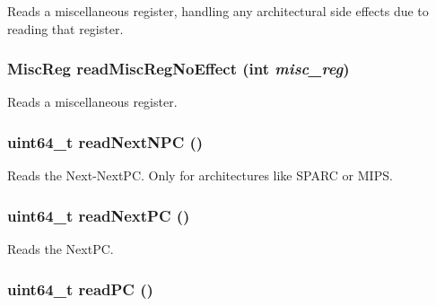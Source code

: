 \label{classExecContext_a5a8c6c487e8da143d26188258b04f1cc}
Reads a miscellaneous register, handling any architectural side effects due to reading that register. \hypertarget{classExecContext_a7b5ac6af9c2c19d7c1b442b8a3aebbc6}{
\subsubsection[{readMiscRegNoEffect}]{\setlength{\rightskip}{0pt plus 5cm}MiscReg readMiscRegNoEffect (int {\em misc\_\-reg})}}
\label{classExecContext_a7b5ac6af9c2c19d7c1b442b8a3aebbc6}
Reads a miscellaneous register. \hypertarget{classExecContext_a1c4619d610f95bf0728b5bfb0333507c}{
\subsubsection[{readNextNPC}]{\setlength{\rightskip}{0pt plus 5cm}uint64\_\-t readNextNPC ()}}
\label{classExecContext_a1c4619d610f95bf0728b5bfb0333507c}
Reads the Next-\/NextPC. Only for architectures like SPARC or MIPS. \hypertarget{classExecContext_acac7689eb460c7ab0e23797c198b7028}{
\subsubsection[{readNextPC}]{\setlength{\rightskip}{0pt plus 5cm}uint64\_\-t readNextPC ()}}
\label{classExecContext_acac7689eb460c7ab0e23797c198b7028}
Reads the NextPC. \hypertarget{classExecContext_a30cb2afdfdc1383b7804c167dcf5ee78}{
\subsubsection[{readPC}]{\setlength{\rightskip}{0pt plus 5cm}uint64\_\-t readPC ()}}
